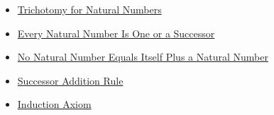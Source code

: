 \begin{dependencies}\hfill
\begin{itemize}
  \item \hyperref[thm:trichotomy-for-natural-numbers]{Trichotomy for Natural Numbers}
  \item \hyperref[thm:every-natural-number-is-one-or-a-successor]{Every Natural Number Is One or a Successor}
  \item \hyperref[thm:no-natural-number-equals-itself-plus-a-natural-number]{No Natural Number Equals Itself Plus a Natural Number}
  \item \hyperref[thm:successor-addition-rule]{Successor Addition Rule}
  \item \hyperref[ax:induction]{Induction Axiom}
\end{itemize}
\end{dependencies}
